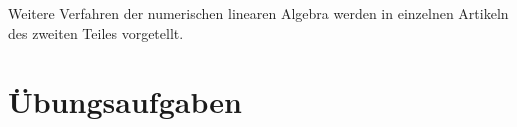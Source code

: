 Weitere Verfahren der numerischen linearen Algebra werden in einzelnen
Artikeln des zweiten Teiles vorgetellt.







\section*{Übungsaufgaben}
\begin{uebungsaufgaben}
\end{uebungsaufgaben}





